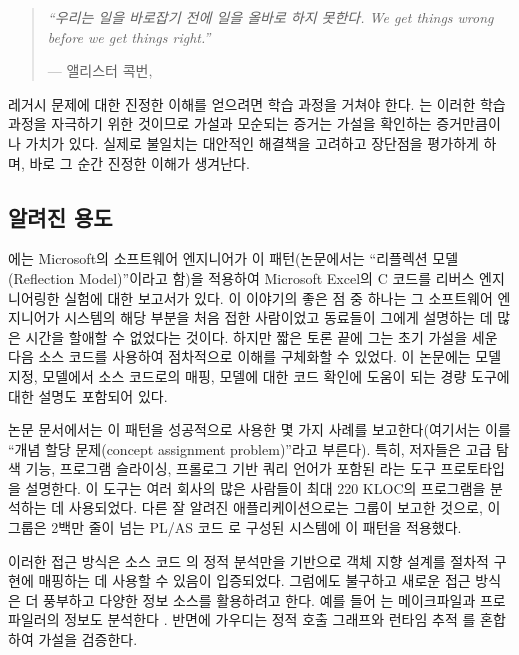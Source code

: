 \documentclass[a4paper,10pt,twoside]{book}
\begin{document}
\begin{quotation}
\noindent
\emph{``우리는 일을 바로잡기 전에 일을 올바로 하지 못한다. We get things wrong before we get things right.''}

\hfill --- 앨리스터 콕번, \cite{Cock93a}
\end{quotation}

레거시 문제에 대한 진정한 이해를 얻으려면 학습 과정을 거쳐야 한다. 는 이러한 학습 과정을 자극하기 위한 것이므로 가설과 모순되는 증거는 가설을 확인하는 증거만큼이나 가치가 있다. 실제로 불일치는 대안적인 해결책을 고려하고 장단점을 평가하게 하며, 바로 그 순간 진정한 이해가 생겨난다.

\subsection*{알려진 용도}

\cite{Murp97a}에는 Microsoft의 소프트웨어 엔지니어가 이 패턴(논문에서는 ``리플렉션 모델(Reflection Model)''이라고 함)을 적용하여 Microsoft Excel의 C 코드를 리버스 엔지니어링한 실험에 대한 보고서가 있다. 이 이야기의 좋은 점 중 하나는 그 소프트웨어 엔지니어가 시스템의 해당 부분을 처음 접한 사람이었고 동료들이 그에게 설명하는 데 많은 시간을 할애할 수 없었다는 것이다. 하지만 짧은 토론 끝에 그는 초기 가설을 세운 다음 소스 코드를 사용하여 점차적으로 이해를 구체화할 수 있었다. 이 논문에는 모델 지정, 모델에서 소스 코드로의 매핑, 모델에 대한 코드 확인에 도움이 되는 경량 도구에 대한 설명도 포함되어 있다.

논문 \cite{Bigg89c} \cite{Bigg93a} \cite{Bigg94a} 문서에서는 이 패턴을 성공적으로 사용한 몇 가지 사례를 보고한다(여기서는 이를 ``개념 할당 문제(concept assignment problem)''라고 부른다). 특히, 저자들은 고급 탐색 기능, 프로그램 슬라이싱, 프롤로그 기반 쿼리 언어가 포함된 라는 도구 프로토타입을 설명한다. 이 도구는 여러 회사의 많은 사람들이 최대 220 KLOC의 프로그램을 분석하는 데 사용되었다. 다른 잘 알려진 애플리케이션으로는  그룹이 보고한 것으로, 이 그룹은 2백만 줄이 넘는 PL/AS 코드 \cite{Wong95a}로 구성된 시스템에 이 패턴을 적용했다.

이러한 접근 방식은 소스 코드 \cite{Gall99a} \cite{Weid98a}의 정적 분석만을 기반으로 객체 지향 설계를 절차적 구현에 매핑하는 데 사용할 수 있음이 입증되었다. 그럼에도 불구하고 새로운 접근 방식은 더 풍부하고 다양한 정보 소스를 활용하려고 한다. 예를 들어 는 메이크파일과 프로파일러의 정보도 분석한다 \cite{Bass98a} \cite{Kazm98b} \cite{Kazm99a}. 반면에 가우디는 정적 호출 그래프와 런타임 추적 \cite{Rich99a}를 혼합하여 가설을 검증한다.
\end{document}
